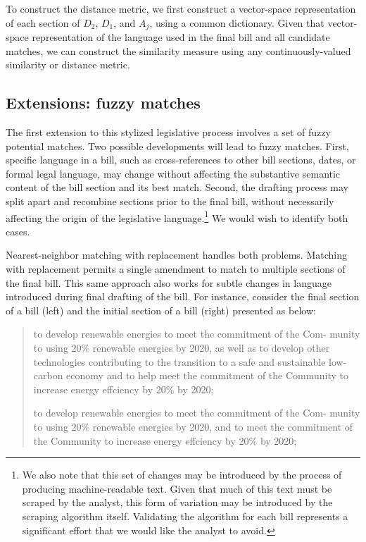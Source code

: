 \documentclass[11pt]{article}
\begin{document}
To construct the distance metric, we first construct a vector-space
representation of each section of $D_2$, $D_1$, and $A_j$, using a
common dictionary. Given that vector-space representation of the
language used in the final bill and all candidate matches, we can
construct the similarity measure using any continuously-valued
similarity or distance metric.

\subsection{Extensions: fuzzy matches}
\label{sec:extens-fuzzy-match}

The first extension to this stylized legislative process involves a
set of fuzzy potential matches. Two possible developments will lead to
fuzzy matches. First, specific language in a bill, such as
cross-references to other bill sections, dates, or formal legal
language, may change without affecting the substantive semantic
content of the bill section and its best match. Second, the drafting
process may split apart and recombine sections prior to the final
bill, without necessarily affecting the origin of the legislative
language.\footnote{We also note that this set of changes may be
  introduced by the process of producing machine-readable text. Given
  that much of this text must be scraped by the analyst, this form of
  variation may be introduced by the scraping algorithm
  itself. Validating the algorithm for each bill represents a
  significant effort that we would like the analyst to avoid.} We would wish to identify both cases.

Nearest-neighbor matching with replacement handles both
problems. Matching with replacement permits a single amendment to
match to multiple sections of the final bill. This same approach also works for subtle changes in language
introduced during final drafting of the bill. For instance, consider
the final section of a bill (left) and the initial section of a bill
(right) presented as below:
\begin{quote}
  \begin{minipage}[t]{0.45\linewidth}
    to develop renewable energies to meet the commitment of the Com-
    munity to using 20\% renewable energies by 2020, as well as to
    develop other technologies contributing to the transition to a
    safe and sustainable low-carbon economy and to help meet the commitment of the Community to increase energy effciency by 20\% by
    2020;
  \end{minipage}
  \begin{minipage}[h]{0.08\linewidth}
  \end{minipage}
  \begin{minipage}[t]{0.45\linewidth}
    to develop renewable energies to meet the commitment of the Com-
    munity to using 20\% renewable energies by 2020, and to meet the
    commitment of the Community to increase energy effciency by 20\%
    by 2020;
  \end{minipage}
\end{quote}
\end{document}
